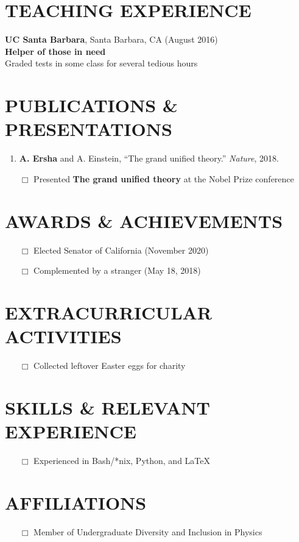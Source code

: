 \documentclass[11pt]{res} %
\begin{document}
\begin{resume}
\section{TEACHING EXPERIENCE}
\textbf{UC Santa Barbara}, Santa Barbara, CA (August 2016) \\
\textbf{Helper of those in need} \\
Graded tests in some class for several tedious hours

\section{PUBLICATIONS \& PRESENTATIONS}

\begin{enumerate}
\item \textbf{A. Ersha} and A. Einstein, ``The grand unified theory.'' \textit{Nature}, 2018.
\end{enumerate}

\begin{itemize} \itemsep -12pt 
 \item[$\Box$] Presented \textbf{The grand unified theory} at
     the Nobel Prize conference \\
\end{itemize}

\section{AWARDS \& ACHIEVEMENTS}
\begin{itemize}
    \item[$\Box$] Elected Senator of California (November 2020)
    \item[$\Box$] Complemented by a stranger (May 18, 2018)
\end{itemize}

\section{EXTRACURRICULAR ACTIVITIES}
\begin{itemize} \itemsep 0pt 
        \item[$\Box$] Collected leftover Easter eggs for charity
\end{itemize}

\section{SKILLS \& RELEVANT EXPERIENCE}
\begin{itemize} \itemsep -4pt 
 \item[$\Box$]  Experienced in Bash/*nix, Python, and LaTeX
\end{itemize}

\section{AFFILIATIONS}
\begin{itemize}
    \item[$\Box$] Member of Undergraduate Diversity and Inclusion in Physics
\end{itemize}

\end{resume}
\end{document}

